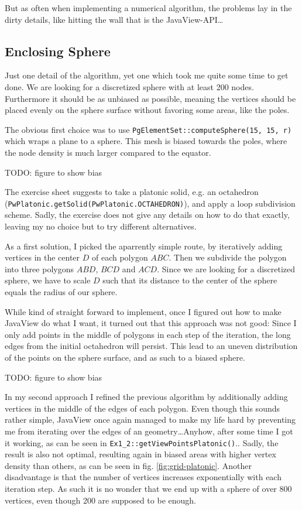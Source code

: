 \documentclass[a4paper,10pt,notitlepage]{scrreprt}
\begin{document}
But as often when implementing a numerical algorithm, the problems lay in the
dirty details, like hitting the wall that is the JavaView-API\dots

\subsection{Enclosing Sphere}

Just one detail of the algorithm, yet one which took me quite some time to get
done. We are looking for a discretized sphere with at least 200 nodes.
Furthermore it should be as unbiased as possible, meaning the vertices should
be placed evenly on the sphere surface without favoring some areas, like the
poles.

The obvious first choice was to use \texttt{PgElementSet::computeSphere(15,
15, r)} which wraps a plane to a sphere. This mesh is biased towards the poles,
where the node density is much larger compared to the equator.

TODO: figure to show bias

The exercise sheet suggests to take a platonic solid, e.g. an octahedron
(\texttt{PwPlatonic.getSolid(PwPlatonic.OCTAHEDRON)}), and apply a loop
subdivision scheme. Sadly, the exercise does not give any details on how to do
that exactly, leaving my no choice but to try different alternatives.

As a first solution, I picked the aparrently simple route, by iteratively adding
vertices in the center $D$ of each polygon $ABC$. Then we subdivide the polygon
into three polygons $ABD$, $BCD$ and $ACD$. Since we are looking for a
discretized sphere, we have to scale $D$ such that its distance to the center of
the sphere equals the radius of our sphere.

While kind of straight forward to implement, once I figured out how to make
JavaView do what I want, it turned out that this approach was not good: Since
I only add points in the middle of polygons in each step of the iteration, the
long edges from the initial octahedron will persist. This lead to an uneven
distribution of the points on the sphere surface, and as such to a biased
sphere.

TODO: figure to show bias

In my second approach I refined the previous algorithm by additionally adding
vertices in the middle of the edges of each polygon. Even though this sounds
rather simple, JavaView once again managed to make my life hard by preventing
me from iterating over the edges of an geometry\dots Anyhow, after some time I
got it working, as can be seen in \texttt{Ex1\_2::getViewPointsPlatonic()}..
Sadly, the result is also not optimal, resulting again in biased areas with
higher vertex density than others, as can be seen in fig.
\ref{fig:grid-platonic}. Another disadvantage is that the number of vertices
increases exponentially with each iteration step. As such it is no wonder that
we end up with a sphere of over 800 vertices, even though 200 are supposed to be
enough.
\end{document}

